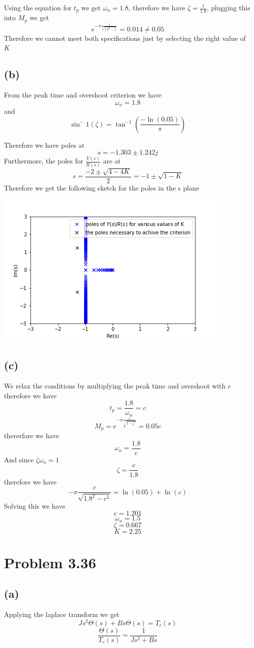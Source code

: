 \documentclass[12pt]{article}
\begin{document}
Using the equation for $t_p$ we get $\omega_n=1.8$, therefore we have 
$\zeta=\frac{1}{1.8}$, plugging this into $M_p$ we get
$$e^{-\pi\frac{1}{\sqrt{1.8^2-1}}}=0.014\neq0.05$$
Therefore we cannot meet both specifications just by selecting
the right value of $K$
\subsection*{(b)}
From the peak time and overshoot criterion we have
$$\omega_n=1.8$$
and
$$\sin^-1(\zeta)=\tan^{-1}\left(\frac{-\ln(0.05)}{\pi}\right)$$

Therefore we have poles at 
$$s=-1.303\pm 1.242j$$
Furthermore, the poles for $\frac{Y(s)}{R(s)}$ are at 
$$s=\frac{-2\pm\sqrt{4-4K}}{2}=-1\pm\sqrt{1-K}$$
Therefore we get the following sketch for the poles in the s plane 

\includegraphics[scale=.5]{Problem3}
\FloatBarrier
\subsection*{(c)}
We relax the conditions by multiplying the peak time
and overshoot with $c$ therefore we have
$$t_p=\frac{1.8}{\omega_n}=c$$
$$M_p=e^{-\pi\frac{\zeta}{\sqrt{1-\zeta^2}}}=0.05c$$
thererfore we have
$$\omega_n=\frac{1.8}{c}$$
And since $\zeta\omega_n=1$
$$\zeta=\frac{c}{1.8}$$
therefore we have
$$-\pi\frac{c}{\sqrt{1.8^2-c^2}}=\ln(0.05)+\ln(c)$$
Solving this we have
$$c=1.201$$
$$\omega_n=1.5$$
$$\zeta=0.667$$
$$K=2.25$$
\section*{Problem 3.36}
\subsection*{(a)}
Applying the laplace transform we get
$$Js^2\Theta(s)+Bs\Theta(s)=T_c(s)$$
$$\frac{\Theta(s)}{T_c(s)}=\boxed{\frac{1}{Js^2+Bs}}$$
\end{document}
